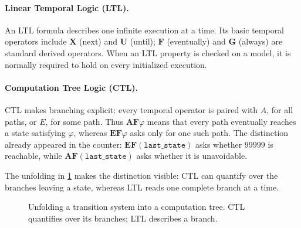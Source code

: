 \paragraph{Linear Temporal Logic (LTL).}
An LTL formula describes one infinite execution at a time.  Its basic
temporal operators include \(\mathbf{X}\) (next) and \(\mathbf{U}\) (until);
\(\mathbf{F}\) (eventually) and \(\mathbf{G}\) (always) are standard derived
operators.  When an LTL property is checked on a model, it is normally
required to hold on every initialized execution.

\paragraph{Computation Tree Logic (CTL).}
CTL makes branching explicit: every temporal operator is paired with
\(A\), for all paths, or \(E\), for some path.  Thus
\(\mathbf{AF}\varphi\) means that every path eventually reaches a state
satisfying \(\varphi\), whereas \(\mathbf{EF}\varphi\) asks only for one
such path.  The distinction already appeared in the counter:
\(\mathbf{EF}(\texttt{last\_state})\) asks whether \(99999\) is reachable,
while \(\mathbf{AF}(\texttt{last\_state})\) asks whether it is unavoidable.

The unfolding in \cref{fig:computation-tree} makes the distinction visible:
CTL can quantify over the branches leaving a state, whereas LTL reads one
complete branch at a time.

\begin{figure}[ht]
  \centering
  \caption{Unfolding a transition system into a computation tree.
           CTL quantifies over its branches; LTL describes a branch.}
  \label{fig:computation-tree}
\end{figure}

